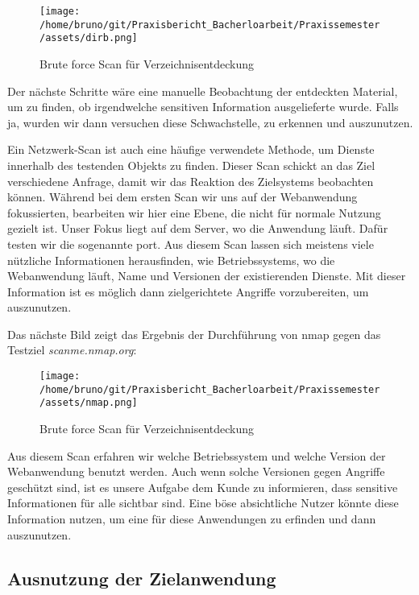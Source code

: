 \begin{figure}[H]
    \centering
    \texttt{[image: /home/bruno/git/Praxisbericht\_Bacherloarbeit/Praxissemester/assets/dirb.png]}
    \caption{Brute force Scan für Verzeichnisentdeckung}
    \centering
\end{figure}

Der nächste Schritte wäre eine manuelle Beobachtung der entdeckten Material, um zu finden, ob irgendwelche sensitiven Information ausgelieferte wurde. Falls ja, wurden wir dann versuchen diese \gls{Schwachstelle}, zu erkennen und auszunutzen.

Ein Netzwerk-Scan ist auch eine häufige verwendete Methode, um Dienste innerhalb des testenden Objekts zu finden. Dieser Scan schickt an das Ziel verschiedene Anfrage, damit wir das Reaktion des Zielsystems beobachten können. Während bei dem ersten Scan wir uns auf der Webanwendung fokussierten, bearbeiten wir hier eine Ebene, die nicht für normale Nutzung gezielt ist. Unser Fokus liegt auf dem Server, wo die Anwendung läuft. Dafür testen wir die sogenannte \gls{port}. Aus diesem Scan lassen sich meistens viele nützliche Informationen herausfinden, wie Betriebssystems, wo die Webanwendung läuft, Name und Versionen der existierenden Dienste. Mit dieser Information ist es möglich dann zielgerichtete Angriffe vorzubereiten, um  auszunutzen.

Das nächste Bild zeigt das Ergebnis der Durchführung von \gls{nmap} gegen das Testziel \textit{scanme.nmap.org}:

\begin{figure}[H]
    \centering
    \texttt{[image: /home/bruno/git/Praxisbericht\_Bacherloarbeit/Praxissemester/assets/nmap.png]}
    \caption{Brute force Scan für Verzeichnisentdeckung}
    \centering
\end{figure}

Aus diesem Scan erfahren wir welche Betriebssystem und welche Version der Webanwendung benutzt werden. Auch wenn solche Versionen gegen Angriffe geschützt sind, ist es unsere Aufgabe dem Kunde zu informieren, dass sensitive Informationen für alle sichtbar sind. Eine böse absichtliche Nutzer könnte diese Information nutzen, um eine  für diese Anwendungen zu erfinden und dann auszunutzen.

\subsection{Ausnutzung der Zielanwendung}

